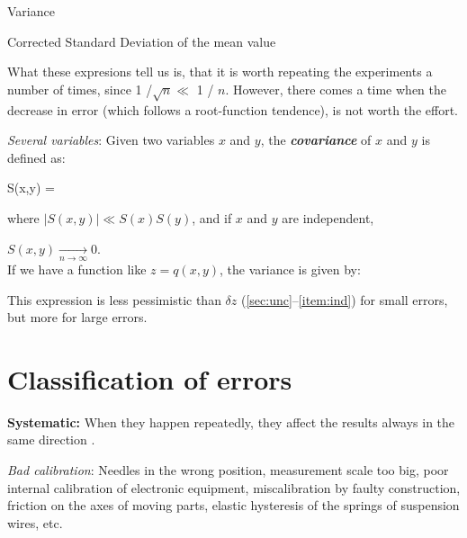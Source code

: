 		\bc\begin{minipage}{.3\textwidth}
			\bc\AlegreyaSansSC\color{gray} Variance\ec
		\end{minipage}%
		\begin{minipage}{.5\textwidth}
		\end{minipage}\ec

		\bc\begin{minipage}{.3\textwidth}
			\bc\AlegreyaSansSC\color{gray} Corrected Standard Deviation of the mean value\ec
		\end{minipage}%
		\begin{minipage}{.5\textwidth}
		\end{minipage}\ec

What these expresions tell us is, that it is worth repeating the experiments a number of times, since 1 /$\sqrt{n} \ll$ 1 / $n$. However, there comes a time when the decrease in error (which follows a root-function tendence), is not worth the effort.

		\item \textit{Several variables}:
Given two variables $x$ and $y$, the \textbf{\textit{covariance}} of $x$ and $y$ is defined as:

		\be S(x,y) =  \ee

  where $\left| S(x,y) \right| \ll S(x)S(y)$, and if $x$ and $y$ are independent,

$S(x,y) \xrightarrow[n \rightarrow \infty]{} 0$.\\[12pt]

If we have a function like $z = q (x, y)$, the variance is given by:

	This expression is less pessimistic than $\delta z$ (\ref{sec:unc}--\ref{item:ind}) for small errors, but more for large errors.

	\ei
\een

\section {Classification of errors}

\ben
	\item \textbf{Systematic:} When they happen repeatedly, they affect the results always in the same direction \cite{gia:75}.
	\bi
		\item \textit{Bad calibration}: 
Needles in the wrong position, measurement scale too big, poor internal calibration of electronic equipment, miscalibration by faulty construction, friction on the axes of moving parts, elastic hysteresis of the springs of suspension wires, etc.

